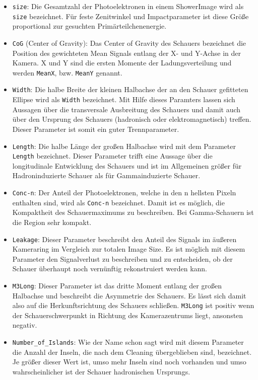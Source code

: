 \begin{itemize}
 \item \texttt{size}: Die Gesamtzahl der Photoelektronen in einem ShowerImage wird als \texttt{size} bezeichnet. Für feste Zenitwinkel und Impactparameter ist diese Größe proportional zur gesuchten Primärteilchenenergie.
 \item \texttt{CoG} (Center of Gravity): Das Center of Gravity des Schauers bezeichnet die Position des gewichteten Mean Signals entlang der X- und Y-Achse in der Kamera. 
 X und Y sind die ersten Momente der Ladungsverteilung und werden \texttt{MeanX}, bzw. \texttt{MeanY} genannt.
 \item \texttt{Width}: Die halbe Breite der kleinen Halbachse der an den Schauer gefitteten Ellipse wird als \texttt{Width} bezeichnet. 
 Mit Hilfe dieses Paramters lassen sich Aussagen über die transversale Ausbreitung des Schauers und damit auch über den Ursprung des Schauers (hadronisch oder elektromagnetisch) treffen. 
 Dieser Parameter ist somit ein guter Trennparameter.
 \item \texttt{Length}: Die halbe Länge der großen Halbachse wird mit dem Parameter \texttt{Length} bezeichnet.
 Dieser Parameter trifft eine Aussage über die longitudinale Entwicklung des Schauers und ist im Allgemeinen größer für Hadroninduzierte Schauer als für Gammainduzierte Schauer.
 \item \texttt{Conc-n}: Der Anteil der Photoelektronen, welche in den n hellsten Pixeln enthalten sind, wird als \texttt{Conc-n} bezeichnet.
 Damit ist es möglich, die Kompaktheit des Schauermaximums zu beschreiben. 
 Bei Gamma-Schauern ist die Region sehr kompakt.
 \item \texttt{Leakage}: Dieser Parameter beschreibt den Anteil des Signals im äußeren Kameraring im Vergleich zur totalen Image Size.
 Es ist möglich mit diesem Parameter den Signalverlust zu beschreiben und zu entscheiden, ob der Schauer überhaupt noch vernünftig rekonstruiert werden kann.
 \item \texttt{M3Long}: Dieser Parameter ist das dritte Moment entlang der großen Halbachse und beschreibt die Asymmetrie des Schauers.
 Es lässt sich damit also auf die Herkunftsrichtung des Schauers schließen. 
 \texttt{M3Long} ist positiv wenn der Schauerschwerpunkt in Richtung des Kamerazentrums liegt, ansonsten negativ.
 \item \texttt{Number\_of\_Islands}: Wie der Name schon sagt wird mit diesem Parameter die Anzahl der Inseln, die nach dem Cleaning übergeblieben sind, bezeichnet. 
 Je größer dieser Wert ist, umso mehr Inseln sind noch vorhanden und umso wahrscheinlicher ist der Schauer hadronischen Ursprungs.
\end{itemize}

